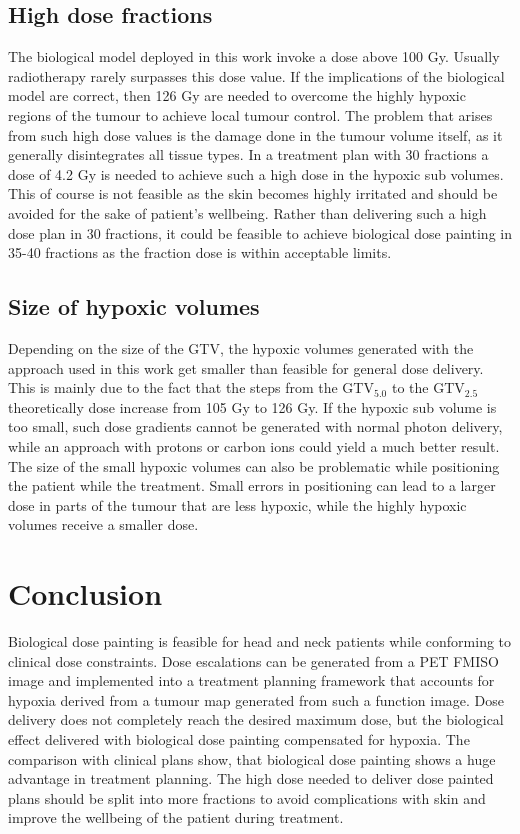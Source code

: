 \subsection{High dose fractions}
The biological model deployed in this work invoke a dose above 100 Gy. Usually radiotherapy rarely surpasses this dose value. If the implications of the biological model are correct, then 126 Gy are needed to overcome the highly hypoxic regions of the tumour to achieve local tumour control. The problem that arises from such high dose values is the damage done in the tumour volume itself, as it generally disintegrates all tissue types. In a treatment plan with 30 fractions a dose of 4.2 Gy is needed to achieve such a high dose in the hypoxic sub volumes. This of course is not feasible as the skin becomes highly irritated and should be avoided for the sake of patient's wellbeing. Rather than delivering such a high dose plan in 30 fractions, it could be feasible to achieve biological dose painting in 35-40 fractions as the fraction dose is within acceptable limits.
\subsection{Size of hypoxic volumes}
Depending on the size of the GTV, the hypoxic volumes generated with the approach used in this work get smaller than feasible for general dose delivery. This is mainly due to the fact that the steps from the GTV$_{5.0}$ to the GTV$_{2.5}$ theoretically dose increase from 105 Gy to 126 Gy. If the hypoxic sub volume is too small, such dose gradients cannot be generated with normal photon delivery, while an approach with protons or carbon ions could yield a much better result. The size of the small hypoxic volumes can also be problematic while positioning the patient while the treatment. Small errors in positioning can lead to a larger dose in parts of the tumour that are less hypoxic, while the highly hypoxic volumes receive a smaller dose. 
\section{Conclusion}
Biological dose painting is feasible for head and neck patients while conforming to clinical dose constraints. Dose escalations can be generated from a PET FMISO image and implemented into a treatment planning framework that accounts for hypoxia derived from a tumour map generated from such a function image. Dose delivery does not completely reach the desired maximum dose, but the biological effect delivered with biological dose painting compensated for hypoxia. The comparison with clinical plans show, that biological dose painting shows a huge advantage in treatment planning. The high dose needed to deliver dose painted plans should be split into more fractions to avoid complications with skin and improve the wellbeing of the patient during treatment.
